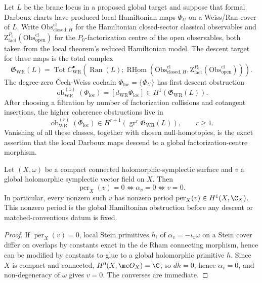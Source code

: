 \begin{defn}\label{defn:global-hamiltonian-descent-complex}
  Let \(L\) be the brane locus in a proposed global target and suppose
  that formal Darboux charts have produced local Hamiltonian maps
  \(\Phi_U\) on a Weiss/Ran cover of \(L\).  Write
  \(\mathrm{Obs}^{\mathrm{cl}}_{\mathrm{closed},H}\) for the
  Hamiltonian closed-sector classical observables and
  \(\mathrm Z^{P_0}_{\mathrm{fact}}(\mathrm{Obs}^{\mathrm{cl}}_{\mathrm{open}})\)
  for the \(P_0\)-factorization centre of the open observables, both
  taken from the local theorem's reduced Hamiltonian model.  The
  descent target for these maps is the total complex
  \[
  \mathfrak G_{\mathrm{WR}}(L)=
  \operatorname{Tot} C^\bullet_{\mathrm{WR}}\!\left(
    \operatorname{Ran}(L);
    \underline{\operatorname{RHom}}\left(
      \mathrm{Obs}^{\mathrm{cl}}_{\mathrm{closed},H},
      \mathrm Z^{P_0}_{\mathrm{fact}}
        (\mathrm{Obs}^{\mathrm{cl}}_{\mathrm{open}})
    \right)\right).
  \]
  The degree-zero \v{C}ech-Weiss cochain \(\Phi_{\mathrm{loc}}=\{\Phi_U\}\)
  has first descent obstruction
  \[
    \operatorname{ob}^{(1)}_{\mathrm{WR}}(\Phi_{\mathrm{loc}})
      =[d_{\mathrm{WR}}\Phi_{\mathrm{loc}}]
      \in H^1(\mathfrak G_{\mathrm{WR}}(L)).
  \]
  After choosing a filtration by number of factorization collisions and
  cotangent insertions, the higher coherence obstructions live in
  \[
    \operatorname{ob}^{(r)}_{\mathrm{WR}}(\Phi_{\mathrm{loc}})
      \in
      H^{r+1}\!\left(
        \operatorname{gr}^r\mathfrak G_{\mathrm{WR}}(L)
      \right),
      \qquad r\ge 1.
  \]
  Vanishing of all these classes, together with chosen null-homotopies, is
  the exact assertion that the local Darboux maps descend to a global
  factorization-centre morphism.
\end{defn}

\begin{thm}\label{thm:compact-period-sharp}
  Let \((X,\omega)\) be a compact connected holomorphic-symplectic
  surface and \(v\) a global holomorphic symplectic vector field on
  \(X\).  Then
  \[
    \operatorname{per}_X(v)=0
    \iff
    \alpha_v=0
    \iff
    v=0 .
  \]
  In particular, every nonzero such \(v\) has nonzero period
  \(\operatorname{per}_X(v)\in H^1(X,\C_X)\).  This nonzero period is the
  global Hamiltonian obstruction before any descent or matched-conventions
  datum is fixed.
\end{thm}

\begin{proof}
  If \(\operatorname{per}_X(v)=0\), local Stein primitives \(h_i\) of
  \(\alpha_v=-\iota_v\omega\) on a Stein cover differ on overlaps by
  constants exact in the de Rham connecting morphism, hence can be
  modified by constants to glue to a global holomorphic primitive
  \(h\).  Since \(X\) is compact and connected,
  \(H^0(X,\mc O_X)=\C\), so \(dh=0\), hence \(\alpha_v=0\), and
  non-degeneracy of \(\omega\) gives \(v=0\).  The converses are
  immediate.
\end{proof}

